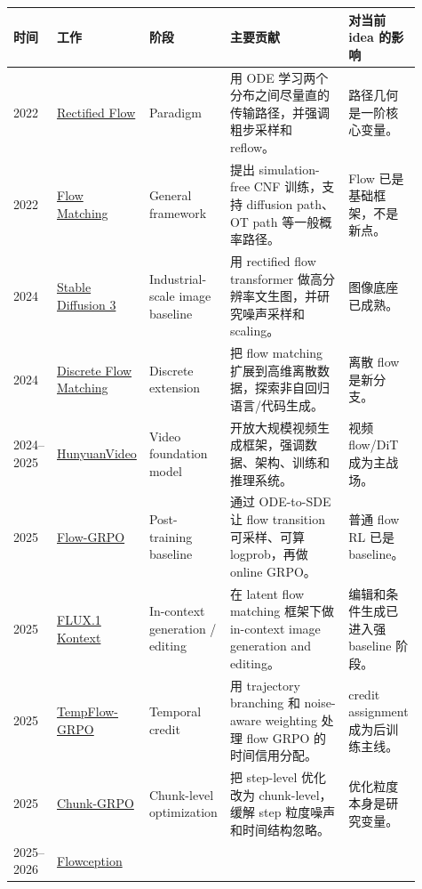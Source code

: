 {\small
\setlength{\tabcolsep}{3pt}
\renewcommand{\arraystretch}{1.12}
\begin{longtable}{p{0.08\linewidth} p{0.20\linewidth} p{0.16\linewidth} p{0.33\linewidth} p{0.14\linewidth}}
\toprule
\textbf{时间} & \textbf{工作} & \textbf{阶段} & \textbf{主要贡献} & \textbf{对当前 idea 的影响} \\
\midrule
2022 &
\href{https://arxiv.org/abs/2209.03003}{Rectified Flow} &
Paradigm &
用 ODE 学习两个分布之间尽量直的传输路径，并强调粗步采样和 reflow。 &
路径几何是一阶核心变量。 \\
\midrule
2022 &
\href{https://arxiv.org/abs/2210.02747}{Flow Matching} &
General framework &
提出 simulation-free CNF 训练，支持 diffusion path、OT path 等一般概率路径。 &
Flow 已是基础框架，不是新点。 \\
\midrule
2024 &
\href{https://arxiv.org/abs/2403.03206}{Stable Diffusion 3} &
Industrial-scale image baseline &
用 rectified flow transformer 做高分辨率文生图，并研究噪声采样和 scaling。 &
图像底座已成熟。 \\
\midrule
2024 &
\href{https://arxiv.org/abs/2407.15595}{Discrete Flow Matching} &
Discrete extension &
把 flow matching 扩展到高维离散数据，探索非自回归语言/代码生成。 &
离散 flow 是新分支。 \\
\midrule
2024--2025 &
\href{https://arxiv.org/abs/2412.03603}{HunyuanVideo} &
Video foundation model &
开放大规模视频生成框架，强调数据、架构、训练和推理系统。 &
视频 flow/DiT 成为主战场。 \\
\midrule
2025 &
\href{https://arxiv.org/abs/2505.05470}{Flow-GRPO} &
Post-training baseline &
通过 ODE-to-SDE 让 flow transition 可采样、可算 logprob，再做 online GRPO。 &
普通 flow RL 已是 baseline。 \\
\midrule
2025 &
\href{https://arxiv.org/abs/2506.15742}{FLUX.1 Kontext} &
In-context generation / editing &
在 latent flow matching 框架下做 in-context image generation and editing。 &
编辑和条件生成已进入强 baseline 阶段。 \\
\midrule
2025 &
\href{https://arxiv.org/abs/2508.04324}{TempFlow-GRPO} &
Temporal credit &
用 trajectory branching 和 noise-aware weighting 处理 flow GRPO 的时间信用分配。 &
credit assignment 成为后训练主线。 \\
\midrule
2025 &
\href{https://arxiv.org/abs/2510.21583}{Chunk-GRPO} &
Chunk-level optimization &
把 step-level 优化改为 chunk-level，缓解 step 粒度噪声和时间结构忽略。 &
优化粒度本身是研究变量。 \\
\midrule
2025--2026 &
\href{https://arxiv.org/abs/2512.11438}{Flowception} &

\end{longtable}}
